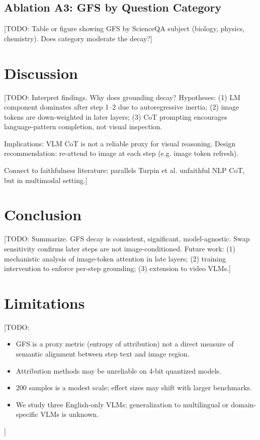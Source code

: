 \documentclass{colm2026}
\begin{document}
\subsection{Ablation A3: GFS by Question Category}

[TODO: Table or figure showing GFS by ScienceQA subject (biology, physics, chemistry).
Does category moderate the decay?]

\section{Discussion}
\label{sec:discussion}

[TODO: Interpret findings.
Why does grounding decay? Hypotheses: (1) LM component dominates after step 1--2
due to autoregressive inertia; (2) image tokens are down-weighted in later layers;
(3) CoT prompting encourages language-pattern completion, not visual inspection.

Implications: VLM CoT is not a reliable proxy for visual reasoning.
Design recommendation: re-attend to image at each step (e.g. image token refresh).

Connect to faithfulness literature: parallels Turpin et al. unfaithful NLP CoT,
but in multimodal setting.]

\section{Conclusion}
\label{sec:conclusion}

[TODO: Summarize. GFS decay is consistent, significant, model-agnostic.
Swap sensitivity confirms later steps are not image-conditioned.
Future work: (1) mechanistic analysis of image-token attention in late layers;
(2) training intervention to enforce per-step grounding; (3) extension to video VLMs.]

\section{Limitations}
\label{sec:limitations}

[TODO:
\begin{itemize}
  \item GFS is a proxy metric (entropy of attribution) not a direct measure
        of semantic alignment between step text and image region.
  \item Attribution methods may be unreliable on 4-bit quantized models.
  \item 200 samples is a modest scale; effect sizes may shift with larger benchmarks.
  \item We study three English-only VLMs; generalization to multilingual or
        domain-specific VLMs is unknown.
\end{itemize}]
\end{document}
